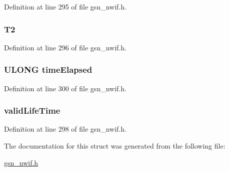 Definition at line 295 of file gsn\_\-nwif.h.

\hypertarget{a00168_ae2a551175ad9eef4bcf84ee25773c78b}{
\subsubsection[{T2}]{ {\bf T2}}}
\label{a00168_ae2a551175ad9eef4bcf84ee25773c78b}


Definition at line 296 of file gsn\_\-nwif.h.

\hypertarget{a00168_a442b8bcc5191ff5752ea8bf38230e4da}{
\subsubsection[{timeElapsed}]{\setlength{\rightskip}{0pt plus 5cm}ULONG {\bf timeElapsed}}}
\label{a00168_a442b8bcc5191ff5752ea8bf38230e4da}


Definition at line 300 of file gsn\_\-nwif.h.

\hypertarget{a00168_aa87f9d507d75c14447e994bd1503d42b}{
\subsubsection[{validLifeTime}]{ {\bf validLifeTime}}}
\label{a00168_aa87f9d507d75c14447e994bd1503d42b}


Definition at line 298 of file gsn\_\-nwif.h.



The documentation for this struct was generated from the following file:\begin{DoxyCompactItemize}
\item 
\hyperlink{a00534}{gsn\_\-nwif.h}\end{DoxyCompactItemize}
